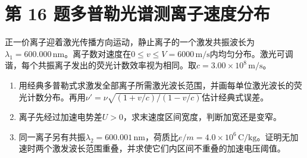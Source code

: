 \documentclass[UTF8,fontset=fandol,a4paper,11pt]{ctexart}
\begin{document}


\section*{第 16 题\quad 多普勒光谱测离子速度分布}\label{q:16}

正一价离子迎着激光传播方向运动，静止离子的一个激发共振波长为$\lambda_1=600.000\,\mathrm{nm}$。离子数对速度在$0\leqslant v\leqslant V=6000\,\mathrm{m/s}$内均匀分布。激光可调谐，每个共振离子发出的荧光计数效率视为相同。取$c=3.00\times10^8\,\mathrm{m/s}$。
\begin{enumerate}[label=（\arabic*）]
\item 用经典多普勒式求激发全部离子所需激光波长范围，并画每单位激光波长的荧光计数分布。再用$\nu'=\nu\sqrt{(1+v/c)/(1-v/c)}$估计经典式误差。
\item 离子先经过加速电势差$U>0$，求末速度区间宽度，判断加宽还是变窄。
\item 同一离子另有共振$\lambda_2=600.001\,\mathrm{nm}$，荷质比$e/m=4.0\times10^6\,\mathrm{C/kg}$。证明无加速时两个激发波长范围重叠，并求使它们内区间不重叠的加速电压阈值。
\end{enumerate}
\end{document}
